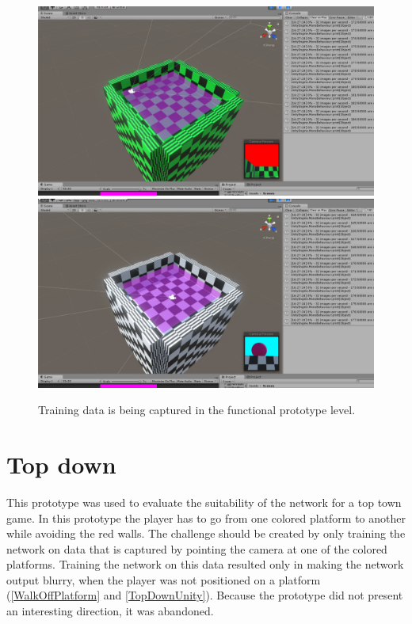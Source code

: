 \begin{figure}[p]
  \centering
  \includegraphics[width=\imgWidth]{images/workflow/Functional1.png} \\[\picVdist]
  \includegraphics[width=\imgWidth]{images/workflow/Functional2.png}
  \caption{Training data is being captured in the functional prototype level.}
  \label{FunctionalCapture}
\end{figure}

\section{Top down}
This prototype was used to evaluate the suitability of the network for a top town game. In this prototype the player has to go from one colored platform to another while avoiding the red walls. The challenge should be created by only training the network on data that is captured by pointing the camera at one of the colored platforms. Training the network on this data resulted only in making the network output blurry, when the player was not positioned on a platform (\cref{WalkOffPlatform} and \cref{TopDownUnity}). Because the prototype did not present an interesting direction, it was abandoned.

